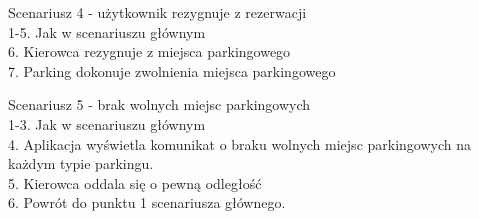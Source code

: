 {\noindent Scenariusz 4 - użytkownik rezygnuje z rezerwacji \\
\hspace*{1cm} 1-5. Jak w scenariuszu głównym \\
\hspace*{1cm} 6. Kierowca rezygnuje z miejsca parkingowego \\
\hspace*{1cm} 7. Parking dokonuje zwolnienia miejsca parkingowego \\

}

\noindent Scenariusz 5 - brak wolnych miejsc parkingowych \\
\hspace*{1cm} 1-3. 	Jak w scenariuszu głównym \\
\hspace*{1cm} 4.	Aplikacja wyświetla komunikat o braku wolnych miejsc parkingowych na każdym typie parkingu. \\
\hspace*{1cm} 5. Kierowca oddala się o pewną odległość \\
\hspace*{1cm} 6. Powrót do punktu 1 scenariusza głównego. \\
